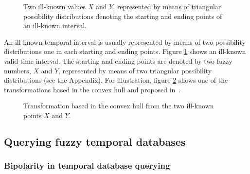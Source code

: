 \begin{figure}
\centering

\caption{Two ill-known values $X$ and $Y$, represented by means of triangular possibility distributions denoting the starting and ending points of an ill-known interval. }
\label{fig:interval}
\end{figure}


An ill-known temporal interval is usually represented by means of two possibility distributions one in each starting and ending points. Figure \ref{fig:interval} shows an ill-known valid-time interval. The starting and ending points are denoted by two fuzzy numbers, $X$ and $Y$, represented by means of two triangular possibility distributions (see the Appendix). For illustration, figure \ref{fig:convexhull} shows one of the transformations based in the convex hull and proposed in~\cite{garrido2009}.

\begin{figure}
\centering

\caption{Transformation based in the convex hull from the two ill-known points $X$ and $Y$. }
\label{fig:convexhull}
\end{figure}

\subsection{Querying fuzzy temporal databases}
\label{subsec:querying-time-intervals}



\subsubsection{Bipolarity in temporal database querying}